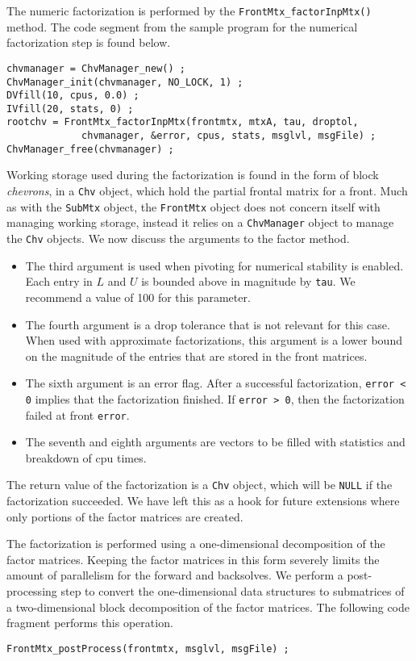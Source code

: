 \par
The numeric factorization is performed by the 
{\tt FrontMtx\_factorInpMtx()} method.  
The code segment from the sample program for the numerical
factorization step is found below.
\begin{verbatim}
chvmanager = ChvManager_new() ;
ChvManager_init(chvmanager, NO_LOCK, 1) ;
DVfill(10, cpus, 0.0) ;
IVfill(20, stats, 0) ;
rootchv = FrontMtx_factorInpMtx(frontmtx, mtxA, tau, droptol,
             chvmanager, &error, cpus, stats, msglvl, msgFile) ;
ChvManager_free(chvmanager) ;
\end{verbatim}
Working storage used during the factorization is found in the form
of block {\it chevrons}, in a {\tt Chv} object, which hold the partial 
frontal matrix for a front.
Much as with the {\tt SubMtx} object, the {\tt FrontMtx} object does
not concern itself with managing working storage, instead it relies
on a {\tt ChvManager} object to manage the {\tt Chv} objects.
We now discuss the arguments to the factor method.
\begin{itemize}
\item
The third argument is used when pivoting for numerical stability is
enabled.
Each entry in $L$ and $U$ is bounded above in magnitude by {\tt tau}.
We recommend a value of 100 for this parameter.
\item
The fourth argument is a drop tolerance 
that is not relevant for this case.
When used with approximate factorizations, this argument is a lower
bound on the magnitude of the entries that are stored in the front
matrices.
\item
The sixth argument is an error flag.
After a successful factorization, {\tt error < 0} implies that the
factorization finished.
If {\tt error > 0}, then the factorization failed at front {\tt error}.
\item
The seventh and eighth arguments are vectors to be filled with 
statistics and breakdown of cpu times.
\end{itemize}
The return value of the factorization is a {\tt Chv} object, which
will be {\tt NULL} if the factorization succeeded.
We have left this as a hook for future extensions where only 
portions of the factor matrices are created.
\par
The factorization is performed using a one-dimensional
decomposition of the factor matrices.
Keeping the factor matrices in this form severely limits the amount
of parallelism for the forward and backsolves.
We perform a post-processing step to convert the one-dimensional
data structures to submatrices of a two-dimensional block
decomposition of the factor matrices.
The following code fragment performs this operation.
\begin{verbatim}
FrontMtx_postProcess(frontmtx, msglvl, msgFile) ;
\end{verbatim}
\par
